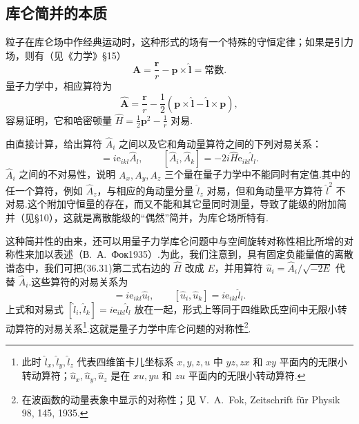 \subsection*{库仑简并的本质}

粒子在库仑场中作经典运动时，这种形式的场有一个特殊的守恒定律；如果是引力场，则有（见《力学》§15）
\begin{equation}
  \boldsymbol{A}=\frac{\boldsymbol{r}}{r}-\boldsymbol{p}\times\hat{\boldsymbol{l}}=\text{常数}.
\end{equation}
量子力学中，相应算符为
\begin{equation}
  \hat{\boldsymbol{A}}=\frac{\boldsymbol{r}}{r}
  -\frac{1}{2}\left(\boldsymbol{p}\times\hat{\boldsymbol{l}}
  -\hat{\boldsymbol{l}}\times\boldsymbol{p}\right),
\end{equation}
容易证明，它和哈密顿量 $\hat{H}=\frac{1}{2}\boldsymbol{p}^2-\frac{1}{r}$ 对易.

由直接计算，给出算符 $\hat{A}_i$ 之间以及它和角动量算符之间的下列对易关系：
\begin{equation}
  [\hat{l}_i,\hat{A}_k]=i\mathrm{e}_{ikl}\hat{A}_l,\qquad
  [\hat{A}_i,\hat{A}_k]=-2i\hat{H}\mathrm{e}_{ikl}\hat{l}_l.
\end{equation}
$\hat{A}_i$ 之间的不对易性，说明 $A_x,A_y,A_z$ 三个量在量子力学中不能同时有定值.其中的任一个算符，例如 $\hat{A}_z$，与相应的角动量分量 $\hat{l}_z$ 对易，但和角动量平方算符 $\hat{l}^2$ 不对易.这个附加守恒量的存在，而又不能和其它量同时测量，导致了能级的附加简并（见§10），这就是离散能级的“偶然”简并，为库仑场所特有.

这种简并性的由来，还可以用量子力学库仑问题中与空间旋转对称性相比所增的对称性来加以表述（В.~А.~Фок1935）.为此，我们注意到，具有固定负能量值的离散谱态中，我们可把(36.31)第二式右边的 $\hat{H}$ 改成 $E$，并用算符 $\hat{u}_i=\hat{A}_i/\sqrt{-2E}$ 代替 $\hat{A}_i$.这些算符的对易关系为
\begin{equation}
  [\hat{l}_i,\hat{u}_k]=i\mathrm{e}_{ikl}\hat{u}_l,\qquad
  [\hat{u}_i,\hat{u}_k]=i\mathrm{e}_{ikl}\hat{l}_l.
\end{equation}
上式和对易式 $[\hat{l}_i,\hat{l}_k]=i\mathrm{e}_{ikl}\hat{l}_l$ 放在一起，形式上等同于四维欧氏空间中无限小转动算符的对易关系\footnote{此时 $\hat{l}_x,\hat{l}_y,\hat{l}_z$ 代表四维笛卡儿坐标系 $x,y,z,u$ 中 $yz,zx$ 和 $xy$ 平面内的无限小转动算符；$\hat{u}_x,\hat{u}_y,\hat{u}_z$ 是在 $xu,yu$ 和 $zu$ 平面内的无限小转动算符.}.这就是量子力学中库仑问题的对称性\footnote{在波函数的动量表象中显示的对称性；见 V.~A.~Fok, Zeitschrift für Physik 98, 145, 1935.}.

